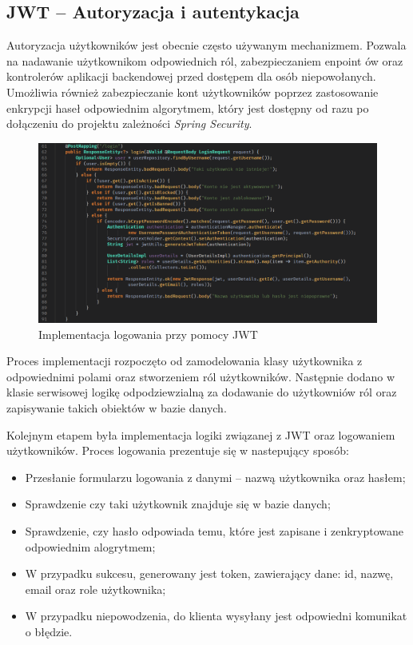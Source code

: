 \subsection{JWT -- Autoryzacja i autentykacja}
Autoryzacja użytkowników jest obecnie często używanym mechanizmem. Pozwala na nadawanie użytkownikom odpowiednich ról, zabezpieczaniem enpoint
ów oraz kontrolerów aplikacji backendowej przed dostępem dla osób niepowołanych. Umożliwia również zabezpieczanie kont użytkowników poprzez zastosowanie enkrypcji haseł odpowiednim algorytmem, który jest dostępny od razu po dołączeniu do projektu zależności \textit{Spring Security}.
\begin{figure}[H]
  \centering
  \includegraphics[width=1\linewidth]{rysunki/login.PNG}
  \caption{Implementacja logowania przy pomocy JWT}
  \label{fig:JWT}
\end{figure}  

Proces implementacji rozpoczęto od zamodelowania klasy użytkownika z odpowiednimi polami oraz stworzeniem ról użytkowników. Następnie dodano w klasie serwisowej logikę odpodziewzialną za dodawanie do użytkowniów ról oraz zapisywanie takich obiektów w bazie danych.

Kolejnym etapem była implementacja logiki związanej z JWT oraz logowaniem użytkowników. Proces logowania prezentuje się w nastepujący sposób:
\begin{itemize}[leftmargin=1cm]
  \item Przesłanie formularzu logowania z danymi -- nazwą użytkownika oraz hasłem;
  \item Sprawdzenie czy taki użytkownik znajduje się w bazie danych;
  \item Sprawdzenie, czy hasło odpowiada temu, które jest zapisane i zenkryptowane odpowiednim alogrytmem;
  \item W przypadku sukcesu, generowany jest token, zawierający dane: id, nazwę, email oraz role użytkownika;
  \item W przypadku niepowodzenia, do klienta wysyłany jest odpowiedni komunikat o błędzie.
\end{itemize}


